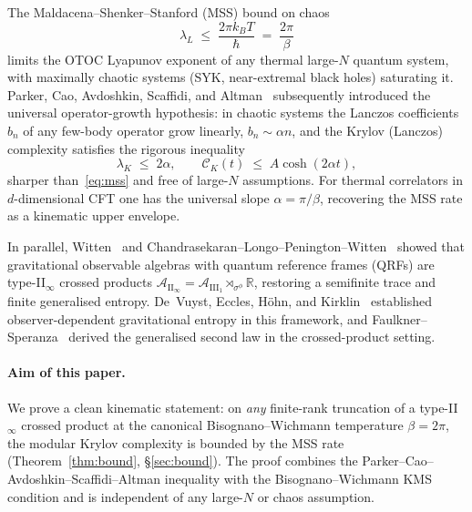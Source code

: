 \documentclass[12pt,a4paper]{article}
\begin{document}
The Maldacena--Shenker--Stanford (MSS) bound on chaos~\cite{MSS2016}
\begin{equation}
  \lambda_L \;\le\; \frac{2\pi k_B T}{\hbar} \;=\; \frac{2\pi}{\beta}
  \label{eq:mss}
\end{equation}
limits the OTOC Lyapunov exponent of any thermal large-$N$ quantum system,
with maximally chaotic systems (SYK, near-extremal black holes)
saturating it.
Parker, Cao, Avdoshkin, Scaffidi, and Altman~\cite{Parker2019} subsequently
introduced the universal operator-growth hypothesis: in chaotic systems
the Lanczos coefficients $b_n$ of any few-body operator grow linearly,
$b_n \sim \alpha n$, and the Krylov (Lanczos) complexity satisfies
the rigorous inequality
\begin{equation}
  \lambda_K \;\le\; 2\alpha,\qquad
  \mathcal{C}_K(t) \;\le\; A \cosh(2\alpha t),
  \label{eq:parker}
\end{equation}
sharper than~\eqref{eq:mss} and free of large-$N$ assumptions.
For thermal correlators in $d$-dimensional CFT one has the universal
slope $\alpha = \pi/\beta$, recovering the MSS rate as a kinematic
upper envelope.

In parallel, Witten~\cite{Witten2022} and Chandrasekaran--Longo--Penington--Witten~\cite{CLPW2023}
showed that gravitational observable algebras with quantum reference
frames (QRFs) are type-II$_\infty$ crossed products
$\mathcal{A}_{\mathrm{II}_\infty} = \mathcal{A}_{\mathrm{III}_1}
\rtimes_{\sigma^\phi} \mathbb{R}$, restoring a semifinite trace and
finite generalised entropy.
De~Vuyst, Eccles, H\"{o}hn, and Kirklin~\cite{DEHK2025a,DEHK2025b}
established observer-dependent gravitational entropy in this framework,
and Faulkner--Speranza~\cite{FaulknerSperanza2024} derived the
generalised second law in the crossed-product setting.

\paragraph{Aim of this paper.}
We prove a clean kinematic statement:
on \emph{any} finite-rank truncation of a type-II$_\infty$ crossed
product at the canonical Bisognano--Wichmann temperature $\beta = 2\pi$,
the modular Krylov complexity is bounded by the MSS rate
(Theorem~\ref{thm:bound}, \S\ref{sec:bound}).
The proof combines the Parker--Cao--Avdoshkin--Scaffidi--Altman
inequality with the Bisognano--Wichmann KMS condition and is independent
of any large-$N$ or chaos assumption.
\end{document}
